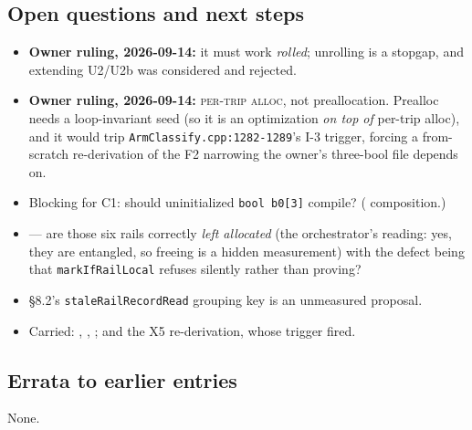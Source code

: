 \subsection*{Open questions and next steps}
\begin{itemize}
  \item \textbf{Owner ruling, 2026-09-14:} it must work \emph{rolled}; unrolling is a stopgap,
        and extending U2/U2b was considered and rejected.
  \item \textbf{Owner ruling, 2026-09-14:} \textsc{per-trip alloc}, not preallocation. Prealloc
        needs a loop-invariant seed (so it is an optimization \emph{on top of} per-trip alloc),
        and it would trip \texttt{ArmClassify.cpp:1282-1289}'s I-3 trigger, forcing a from-scratch
        re-derivation of the F2 narrowing the owner's three-bool file depends on.
  \item Blocking for C1: should uninitialized \texttt{bool b0[3]} compile? ( composition.)
  \item {} --- are those six rails correctly \emph{left allocated} (the orchestrator's
        reading: yes, they are entangled, so freeing is a hidden measurement) with the defect
        being that \texttt{markIfRailLocal} refuses silently rather than proving?
  \item {} \S8.2's \texttt{staleRailRecordRead} grouping key is an unmeasured proposal.
  \item Carried: , , ; and the X5 re-derivation, whose trigger fired.
\end{itemize}

\subsection*{Errata to earlier entries}
None.
